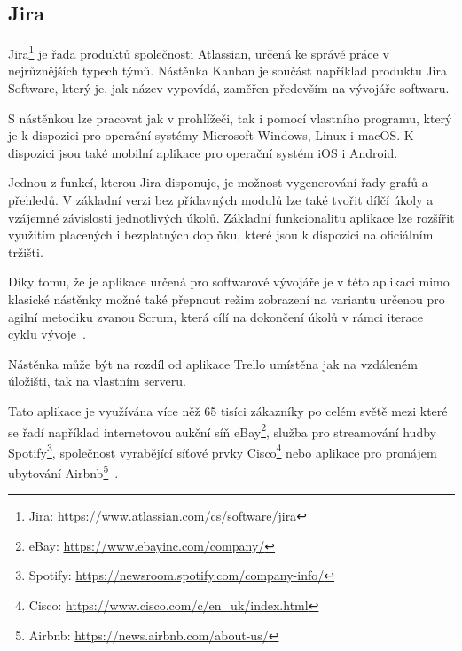 \subsection{Jira}
Jira\footnote{Jira: \url{https://www.atlassian.com/cs/software/jira}} je řada produktů společnosti Atlassian, určená ke správě práce v nejrůznějších typech týmů. Nástěnka Kanban je součást například produktu Jira Software, který je, jak název vypovídá, zaměřen především na vývojáře softwaru. 

S nástěnkou lze pracovat jak v prohlížeči, tak i pomocí vlastního programu, který je k dispozici pro operační systémy Microsoft Windows, Linux i macOS. K dispozici jsou také mobilní aplikace pro operační systém iOS i Android. 

Jednou z funkcí, kterou Jira disponuje, je možnost vygenerování řady grafů a přehledů. V základní verzi bez přídavných modulů lze také tvořit dílčí úkoly a vzájemné závislosti jednotlivých úkolů. Základní funkcionalitu aplikace lze rozšířit využitím placených i bezplatných doplňku, které jsou k dispozici na oficiálním tržišti.

Díky tomu, že je aplikace určená pro softwarové vývojáře je v této aplikaci mimo klasické nástěnky možné také přepnout režim zobrazení na variantu určenou pro agilní metodiku zvanou Scrum, která cílí na dokončení úkolů v rámci iterace cyklu vývoje~\cite{bib:trello-vs-jira-2020}.

Nástěnka může být na rozdíl od aplikace Trello umístěna jak na vzdáleném úložišti, tak na vlastním serveru.

Tato aplikace je využívána více něž 65 tisíci zákazníky po celém světě mezi které se řadí například internetovou aukční síň eBay\footnote{eBay: \url{https://www.ebayinc.com/company/}}, služba pro streamování hudby Spotify\footnote{Spotify: \url{https://newsroom.spotify.com/company-info/}}, společnost vyrabějící síťové prvky Cisco\footnote{Cisco: \url{https://www.cisco.com/c/en_uk/index.html}} nebo aplikace pro pronájem ubytování Airbnb\footnote{Airbnb: \url{https://news.airbnb.com/about-us/}}~\cite{bib:jira-homepage}.

